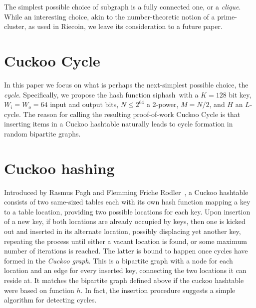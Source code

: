 \documentclass[11pt, oneside]{article}
\newcommand{\hash}{{\rm siphash}}
\begin{document}
The simplest possible choice of subgraph is a fully connected one, or a {\em clique}.
While an interesting choice, akin to the number-theoretic notion of a prime-cluster,
as used in Riecoin, we leave its consideration to a future paper.

\section{Cuckoo Cycle}
In this paper we focus on what is perhaps the next-simplest possible choice, the {\em cycle}.
Specifically, we propose the hash function \hash\ with a $K=128$ bit key, $W_i = W_o = 64$ input
and output bits, $N \leq 2^{64}$ a 2-power, $M=N/2$, and $H$ an $L$-cycle.
The reason for calling the resulting proof-of-work Cuckoo Cycle is that
inserting items in a Cuckoo hashtable naturally leads to cycle formation
in random bipartite graphs.

\section{Cuckoo hashing}
Introduced by Rasmus Pagh and Flemming Friche
Rodler~\cite{Pagh04cuckoohashing}, a Cuckoo hashtable consists of two
same-sized tables each with its own hash function mapping a key to a table
location, providing two possible locations for each key.
Upon insertion of a new key, if both locations are already occupied by keys,
then one is kicked out and inserted in its alternate location, possibly
displacing yet another key, repeating the process until either a vacant
location is found, or some maximum number of iterations is reached.
The latter is bound to happen once cycles have formed in the {\em Cuckoo graph}.
This is a bipartite graph with a node for each location and an
edge for every inserted key, connecting the two locations it can reside at.
It matches the bipartite graph defined above if the cuckoo hashtable
were based on function $h$.
In fact, the insertion procedure suggests a simple algorithm for detecting cycles.
\end{document}
